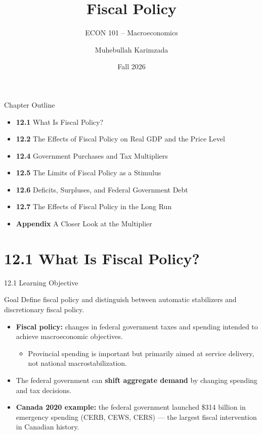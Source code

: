 \documentclass[aspectratio=169]{beamer}
\title{\textbf{Fiscal Policy}}
\subtitle{{\large ECON 101 -- Macroeconomics}}
\author{Muhebullah Karimzada}
\date{Fall 2026}
\begin{document}

\begin{frame}[plain]
  \titlepage
\end{frame}

\begin{frame}{Chapter Outline}
\transfade
\begin{itemize}[<+->]
  \item \textbf{12.1} What Is Fiscal Policy?
  \item \textbf{12.2} The Effects of Fiscal Policy on Real GDP and the Price Level
  \item \textbf{12.4} Government Purchases and Tax Multipliers
  \item \textbf{12.5} The Limits of Fiscal Policy as a Stimulus
  \item \textbf{12.6} Deficits, Surpluses, and Federal Government Debt
  \item \textbf{12.7} The Effects of Fiscal Policy in the Long Run
  \item \textbf{Appendix} A Closer Look at the Multiplier
\end{itemize}
\end{frame}

\section{12.1 What Is Fiscal Policy?}

\begin{frame}{12.1 Learning Objective}
\transfade
\begin{block}{Goal}
Define fiscal policy and distinguish between automatic stabilizers and discretionary fiscal policy.
\end{block}
\begin{itemize}[<+->]
  \item \textbf{Fiscal policy:} changes in \alert{federal government taxes and spending} intended to achieve macroeconomic objectives.
  \begin{itemize}[<+->]
    \item Provincial spending is important but primarily aimed at service delivery, not national macrostabilization.
  \end{itemize}
  \item The federal government can \textbf{shift aggregate demand} by changing spending and tax decisions.
  \item \textbf{Canada 2020 example:} the federal government launched \$314 billion in emergency spending (CERB, CEWS, CERS) --- the largest fiscal intervention in Canadian history.
\end{itemize}
\end{frame}
\end{document}
